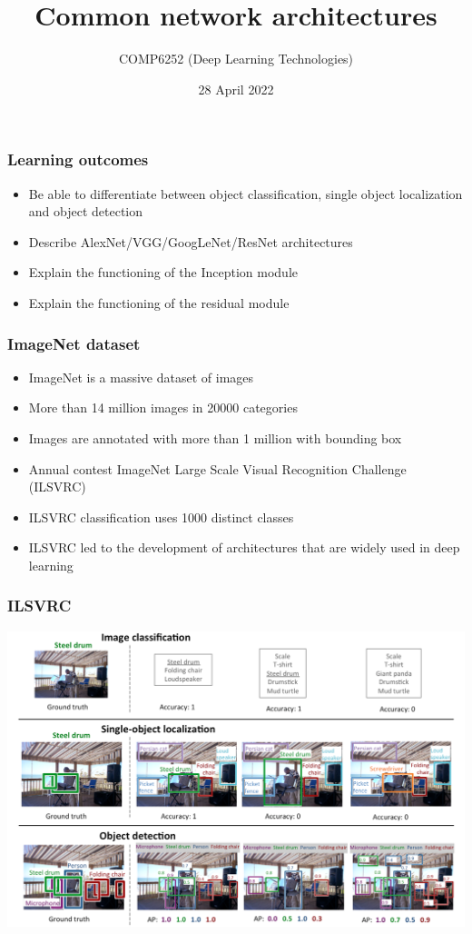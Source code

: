 \documentclass{beamer}
\begin{document}
\title{Common network architectures}
\author{COMP6252 (Deep Learning Technologies)}
 \date{28 April 2022}
 \date{}
\begin{frame}
    \placelogofalse %
    \titlepage
\end{frame}
    
\placelogotrue
\begin{frame}
	\frametitle{Learning outcomes}
\begin{itemize}
	\item Be able to differentiate between object classification, single object localization and object detection

	\item Describe AlexNet/VGG/GoogLeNet/ResNet architectures
	\item Explain the functioning of the Inception module
	\item Explain the functioning of the residual module
\end{itemize}
	

\end{frame}
\begin{frame}
    \frametitle{ImageNet dataset}
\begin{itemize}
    \item ImageNet is a massive dataset of images
    \item More than 14 million images in 20000 categories 
    \item Images are annotated with more than 1 million with bounding box
    \item Annual contest ImageNet Large Scale Visual Recognition Challenge (ILSVRC)
    \item ILSVRC classification uses  1000 distinct classes
    \item ILSVRC led to the development of architectures that are widely used in deep learning
\end{itemize}
    
\end{frame}
\begin{frame}
    \frametitle{ILSVRC}
    \begin{center}
        \includegraphics[width=\textwidth]{figs/ILSVRC.png}
    \end{center}
\end{frame}
\end{document}
